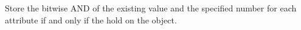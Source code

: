 Store the bitwise AND of the existing value and the specified number for
each attribute if and only if the  hold on the object.



